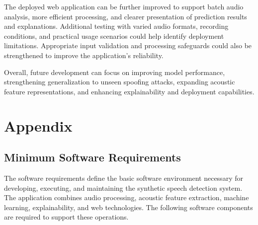 \documentclass[12pt,a4paper]{report}
\begin{document}
The deployed web application can be further improved to support batch audio analysis, more efficient processing, and clearer presentation of prediction results and explanations. Additional testing with varied audio formats, recording conditions, and practical usage scenarios could help identify deployment limitations. Appropriate input validation and processing safeguards could also be strengthened to improve the application's reliability.

Overall, future development can focus on improving model performance, strengthening generalization to unseen spoofing attacks, expanding acoustic feature representations, and enhancing explainability and deployment capabilities. 



\chapter{Appendix}

\section{Minimum Software Requirements}

The software requirements define the basic software environment necessary for developing, executing, and maintaining the synthetic speech detection system. The application combines audio processing, acoustic feature extraction, machine learning, explainability, and web technologies. The following software components are required to support these operations.
\end{document}
